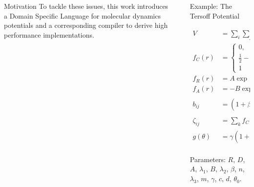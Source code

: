 \begin{frame}[fragile]{}
\begin{columns}[onlytextwidth]
\begin{column}{26.02cm}
\begin{block}{Motivation}
To tackle these issues, this work introduces a Domain Specific Language for molecular dynamics potentials and a corresponding compiler to derive high performance implementations.

\end{block}%
%
\end{column}%
%
\begin{column}{2cm}%
\end{column}%
%
\begin{column}{26.02cm}%
%
%
%

\begin{block}{Example: The Tersoff Potential}

\vspace*{-0.5cm}

\begin{align*}
V &= \sum_i\sum_j f_C(r_{ij}) [ f_R(r_{ij}) + b_{ij} f_A(r_{ij}) ]\\
f_C(r) &= \begin{cases}
  0, & r < R - D\\
  \frac{1}{2} - \frac{1}{2}\sin(\frac{\pi}{2} (r - R) / D), & R - D < r < R + D\\
  1 & r > R + D
\end{cases}\\
f_R(r) &= A\exp(-\lambda_1 r)\\
f_A(r) &= -B\exp(-\lambda_2 r)\\
b_{ij} &= (1 + \beta^n\zeta_{ij}^n)^{1/(2n)}\\
\zeta_{ij} &= \sum_k f_C(r_{ik}) g(\theta_{jik}) \exp(\lambda_3^m (r_{ij} - r_{ik})^m)\\
g(\theta) &= \gamma (1 + c^2/d^2 - c^2/(d^2 + (\cos(\theta) - \cos(\theta_0))^2))\\
\end{align*}


Parameters: $R$, $D$, $A$, $\lambda_1$, $B$, $\lambda_2$, $\beta$, $n$, $\lambda_3$, $m$, $\gamma$, $c$, $d$, $\theta_0$.

\vspace*{1cm}

\end{block}


\end{column}
\end{columns}
\end{frame}
